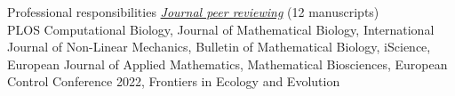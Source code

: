 \documentclass{resume} %
\begin{document}
\begin{rSection}{Professional responsibilities }
\underline{\em Journal peer reviewing} (12 manuscripts)  \\[3pt]
\noindent
{PLOS Computational Biology}, {Journal of Mathematical Biology},  {International Journal of Non-Linear Mechanics},  {Bulletin of Mathematical Biology},  {iScience}, {European Journal of Applied Mathematics}, {Mathematical Biosciences},  {European Control Conference 2022}, {Frontiers in Ecology and Evolution} %


\end{rSection}
\end{document}
